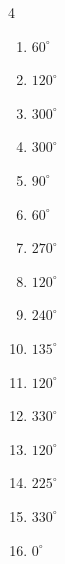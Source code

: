\begin{multicols}{4}
\begin{enumerate}
  \item $\displaystyle 60^{\circ}$

  \item $\displaystyle 120^{\circ}$

  \item $\displaystyle 300^{\circ}$

  \item $\displaystyle 300^{\circ}$

  \item $\displaystyle 90^{\circ}$

  \item $\displaystyle 60^{\circ}$

  \item $\displaystyle 270^{\circ}$

  \item $\displaystyle 120^{\circ}$

  \item $\displaystyle 240^{\circ}$

  \item $\displaystyle 135^{\circ}$

  \item $\displaystyle 120^{\circ}$

  \item $\displaystyle 330^{\circ}$

  \item $\displaystyle 120^{\circ}$

  \item $\displaystyle 225^{\circ}$

\columnbreak %

  \item $\displaystyle 330^{\circ}$

  \item $\displaystyle 0^{\circ}$
        \phantom{$\displaystyle =0$}


\end{enumerate}
\end{multicols}
